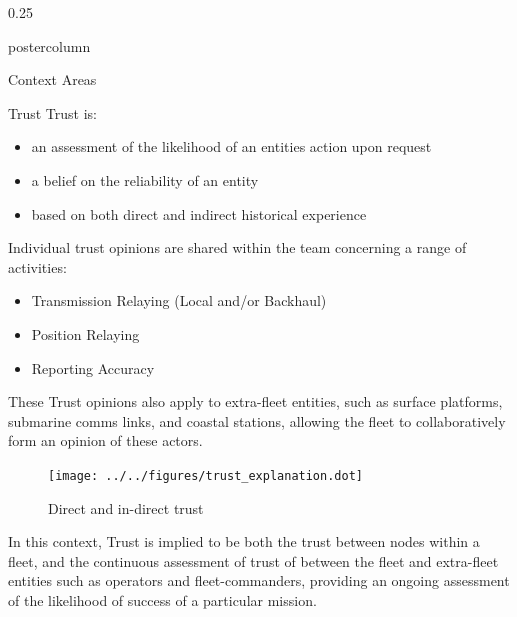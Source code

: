 \documentclass[final,hyperref={pdfpagelabels=false}]{beamer}
\def\colwidth{0.25\linewidth}
\begin{document}
\begin{frame}[fragile]
\begin{columns}[t]
\begin{column}{\colwidth}
\begin{beamercolorbox}[center,wd=\textwidth]{postercolumn}
\begin{minipage}[T]{.98\textwidth}
{\begin{block}{Context Areas}
\begin{itemize}
              \end{itemize}
            \end{block}
\fi
              \begin{block}{Trust}
                  Trust is:
                  \begin{itemize}
                    \item an assessment of the likelihood of an entities action upon request
                    \item a belief on the reliability of an entity
                    \item based on both direct and indirect historical experience
                  \end{itemize}

                  Individual trust opinions are shared within the team concerning a range of activities:
                  \begin{itemize}
                    \item Transmission Relaying (Local and/or Backhaul)
                    \item Position Relaying
                    \item Reporting Accuracy
                  \end{itemize}

                  These Trust opinions also apply to extra-fleet entities, such as surface platforms, submarine comms links, and coastal stations, allowing the fleet to collaboratively form an opinion of these actors.
                  \begin{figure}
                    \vspace{-20pt}
                    \begin{center}
                      \texttt{[image: ../../figures/trust\_explanation.dot]}
                    \end{center}
                    \vspace{-30pt}
                    \caption{Direct and in-direct trust}
                    \vspace{-20pt}
                  \end{figure}
                  In this context, Trust is implied to be both the trust between nodes within a fleet, and the continuous assessment of trust of between the fleet and extra-fleet entities such as operators and fleet-commanders, providing an ongoing assessment of the likelihood of success of a particular mission.
                  

\end{block}}
\end{minipage}
\end{beamercolorbox}
\end{column}
\end{columns}
\end{frame}
\end{document}
